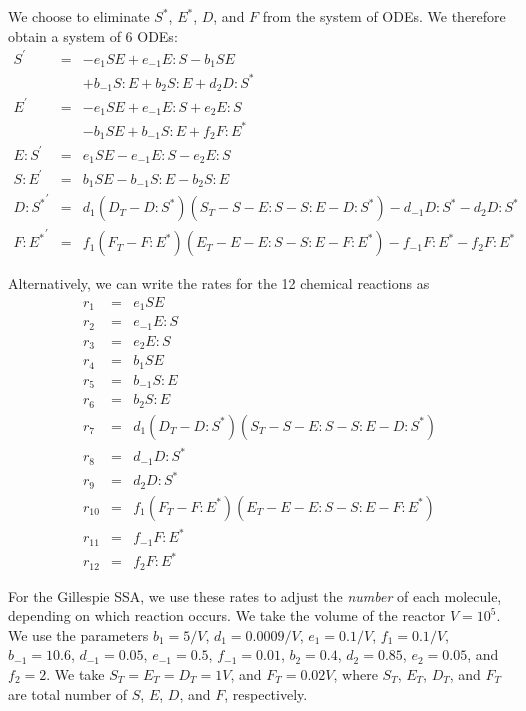 \documentclass[aip,jcp,reprint,twocolumn]{revtex4-1}
\begin{document}
\begin{widetext}
We choose to eliminate $S^{*}$, $E^{*}$, $D$, and $F$ from the system of ODEs.
%
We therefore obtain a system of 6 ODEs:
\begin{equation}
    \begin{array}{rcl}
        S^\prime & = & -e_1 S E + e_{-1} E:S -b_1 S E \\
                        &   & + b_{-1} S:E + b_2 S:E + d_2 D:S^{*} \\
        E^\prime & = & -e_1 S E + e_{-1} E:S + e_2 E:S \\
                        &   & - b_1 S E +b_{-1} S:E + f_2 F:E^{*} \\
        E:S^\prime  & = & e_1 S E -e_{-1} E:S -e_2 E:S \\
        S:E^\prime & = & b_1 S E -b_{-1} S:E -b_2 S:E \\
        {D:S^{*}}^\prime & = & d_1 (D_T - D:S^{*}) (S_T - S - E:S - S:E - D:S^{*}) - d_{-1} D:S^{*} -d_2 D:S^{*} \\
        {F:E^{*}}^\prime & = & f_1 (F_T - F:E^{*}) (E_T - E - E:S - S:E - F:E^{*}) - f_{-1} F:E^{*} -f_2 F:E^{*}
    \end{array}
\end{equation}
\end{widetext}

Alternatively, we can write the rates for the 12 chemical reactions as
\begin{equation}
    \begin{array}{rcl}
        r_1 & = & e_1 S E \\
        r_2 & = & e_{-1} E:S \\
        r_3 & = & e_2 E:S \\
        r_4 & = & b_1 S E \\
        r_5 & = & b_{-1} S:E \\
        r_6 & = & b_2 S:E \\
        r_7 & = & d_1 (D_T - D:S^{*}) (S_T - S - E:S - S:E - D:S^{*}) \\
        r_8 & = & d_{-1} D:S^{*} \\
        r_9 & = & d_2 D:S^{*} \\
        r_{10} & = & f_1 (F_T - F:E^{*}) (E_T - E - E:S - S:E - F:E^{*}) \\
        r_{11} & = & f_{-1} F:E^{*} \\
        r_{12} & = & f_2 F:E^{*}
    \end{array}
\end{equation}

For the Gillespie SSA, we use these rates to adjust the {\em number} of each molecule, depending on which reaction occurs.
%
We take the volume of the reactor $V=10^5$.
%
We use the parameters $b_1=5/V$, $d_1=0.0009/V$, $e_1=0.1/V$, $f_1=0.1/V$, $b_{-1} = 10.6$, $d_{-1}=0.05$, $e_{-1}=0.5$, $f_{-1} =0.01$, $b_2=0.4$, $d_2=0.85$, $e_2=0.05$, and $f_2=2$.
%
We take $S_T=E_T=D_T=1V$, and $F_T=0.02V$, where $S_T$, $E_T$, $D_T$, and $F_T$ are total number of $S$, $E$, $D$, and $F$, respectively.
\end{document}
